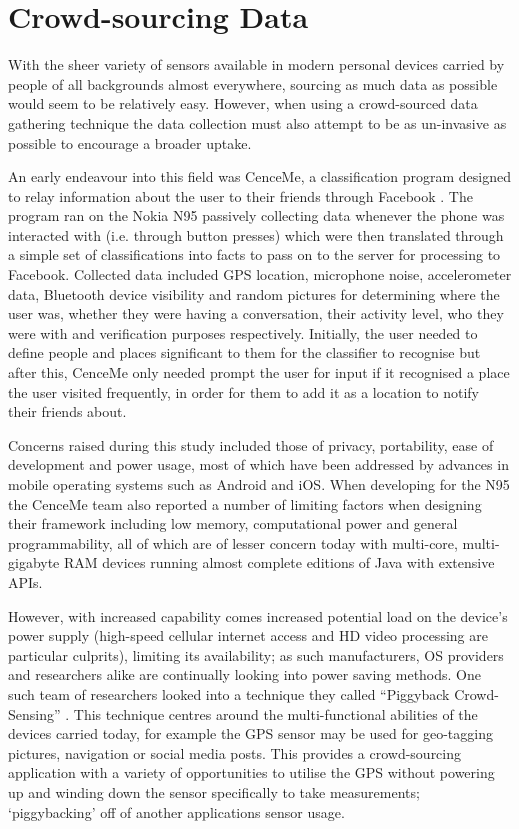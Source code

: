 \documentclass{UoYCSproject}
\begin{document}
        \section{Crowd-sourcing Data}
        \label{sec:crowd}
        
            With the sheer variety of sensors available in modern personal devices carried by people of all backgrounds almost everywhere, sourcing as much data as possible would seem to be relatively easy. However, when using a crowd-sourced data gathering technique the data collection must also attempt to be as un-invasive as possible to encourage a broader uptake. 
            
            An early endeavour into this field was CenceMe, a classification program designed to relay information about the user to their friends through Facebook \citep{miluzzo2008sensing}. The program ran on the Nokia N95 passively collecting data whenever the phone was interacted with (i.e. through button presses) which were then translated through a simple set of classifications into facts to pass on to the server for processing to Facebook. Collected data included GPS location, microphone noise, accelerometer data, Bluetooth device visibility and random pictures for determining where the user was, whether they were having a conversation, their activity level, who they were with and verification purposes respectively. Initially, the user needed to define people and places significant to them for the classifier to recognise but after this, CenceMe only needed prompt the user for input if it recognised a place the user visited frequently, in order for them to add it as a location to notify their friends about.
            
            Concerns raised during this study included those of privacy, portability, ease of development and power usage, most of which have been addressed by advances in mobile operating systems such as Android and iOS. When developing for the N95 the CenceMe team also reported a number of limiting factors when designing their framework including low memory, computational power and general programmability, all of which are of lesser concern today with multi-core, multi-gigabyte RAM devices running almost complete editions of Java with extensive APIs.
            
            However, with increased capability comes increased potential load on the device's power supply (high-speed cellular internet access and HD video processing are particular culprits), limiting its availability; as such manufacturers, OS providers and researchers alike are continually looking into power saving methods. One such team of researchers looked into a technique they called ``Piggyback Crowd-Sensing'' \citep{lane2013piggyback}. This technique centres around the multi-functional abilities of the devices carried today, for example the GPS sensor may be used for geo-tagging pictures, navigation or social media posts. This provides a crowd-sourcing application with a variety of opportunities to utilise the GPS without powering up and winding down the sensor specifically to take measurements; `piggybacking' off of another applications sensor usage. 
            
\end{document}
